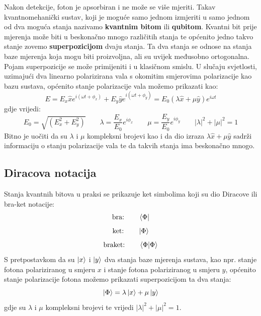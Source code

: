 Nakon detekcije, foton je apsorbiran i ne može se više mjeriti. Takav kvantnomehanički sustav, koji je moguće samo jednom izmjeriti u samo jednom od dva moguća stanja nazivamo \textbf{kvantnim bitom} ili \textbf{qubitom}.
Kvantni bit prije mjerenja može biti u beskonačno mnogo različitih stanja te općenito jedno takvo stanje zovemo \textbf{superpozicijom} dvaju stanja. Ta dva stanja se odnose na stanja baze mjerenja koja mogu biti proizvoljna, ali su uvijek međusobno ortogonalna. Pojam superpozicije se može primijeniti i u klasičnom smislu. U slučaju svjetlosti, uzimajući dva linearno polarizirana vala s okomitim smjerovima polarizacije kao bazu sustava, općenito stanje polarizacije vala možemo prikazati kao:
\begin{equation}
E = E_x \hat{x}e^{i(\omega t + \phi_x)} + E_y \hat{y}e^{i(\omega t + \phi_y)} = E_0(\lambda \hat{x} + \mu \hat{y})e^{i\omega t}
\end{equation}
gdje vrijedi:
\begin{equation}
E_0 = \sqrt{(E_x^2 + E_y^2)}
\qquad
\lambda = \frac{E_x}{E_0}e^{i\phi_x}
\qquad
\mu = \frac{E_y}{E_0}e^{i\phi_y}
\qquad
|\lambda|^2 + |\mu|^2 = 1
\end{equation}
Bitno je uočiti da su $\lambda$ i $\mu$ kompleksni brojevi kao i da dio izraza $\lambda\hat{x}+\mu\hat{y}$ sadrži informaciju o stanju polarizacije vala te da takvih stanja ima beskonačno mnogo.

\subsection{Diracova notacija}
Stanja kvantnih bitova u praksi se prikazuje ket simbolima koji su dio Diracove ili bra-ket notacije:
\[
\text{bra:}
\qquad
\bra{\Phi}
\]
\[
\text{ket:}
\qquad
\ket{\Phi}
\]
\[
\text{braket:}
\qquad
\braket{\Phi|\Phi}
\]
S pretpostavkom da su $\ket{x}$ i $\ket{y}$ dva stanja baze mjerenja sustava, kao npr. stanje fotona polariziranog u smjeru $x$ i stanje fotona polariziranog u smjeru $y$, općenito stanje polarizacije fotona možemo prikazati superpozicijom ta dva stanja:
\[
\ket{\Phi} = \lambda\ket{x} + \mu\ket{y}
\]
gdje su $\lambda$ i $\mu$ kompleksni brojevi te vrijedi $|\lambda|^2 + |\mu|^2 = 1$.

